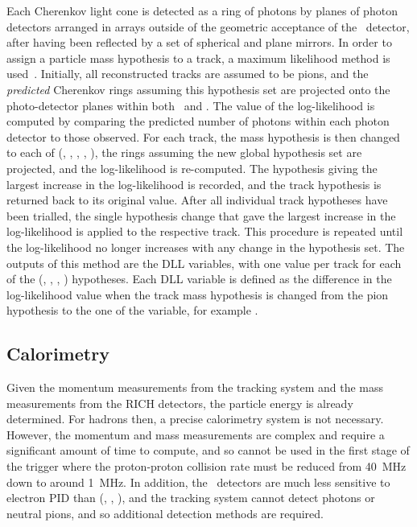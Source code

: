 Each Cherenkov light cone is detected as a ring of photons by planes of photon 
detectors arranged in arrays outside of the geometric acceptance of the \lhcb\ 
detector, after having been reflected by a set of spherical and plane mirrors.
In order to assign a particle mass hypothesis to a track, a maximum likelihood 
method is used~\cite{Forty:1998eqa}.
Initially, all reconstructed tracks are assumed to be pions, and the 
\emph{predicted} Cherenkov rings assuming this hypothesis set are projected 
onto the photo-detector planes within both \richone\ and \richtwo.
The value of the log-likelihood is computed by comparing the predicted number 
of photons within each photon detector to those observed.
For each track, the mass hypothesis is then changed to each of (\Pe, \Pmu, 
\Ppi, \PK, \Pproton), the rings assuming the new global hypothesis set are 
projected, and the log-likelihood is re-computed.
The hypothesis giving the largest increase in the log-likelihood is recorded, 
and the track hypothesis is returned back to its original value.
After all individual track hypotheses have been trialled, the single hypothesis 
change that gave the largest increase in the log-likelihood is applied to the 
respective track.
This procedure is repeated until the log-likelihood no longer increases with 
any change in the hypothesis set.
The outputs of this method are the \ac{DLL} variables, with one value per track 
for each of the (\Pe, \Pmu, \PK, \Pproton) hypotheses.
Each \ac{DLL} variable is defined as the difference in the log-likelihood value 
when the track mass hypothesis is changed from the pion hypothesis to the one 
of the variable, for example \dllkpi.

\subsection{Calorimetry}
\label{chap:intro:lhcb:detector:calo}

Given the momentum measurements from the tracking system and the mass 
measurements from the \ac{RICH} detectors, the particle energy is already 
determined.
For hadrons then, a precise calorimetry system is not necessary.
However, the momentum and mass measurements are complex and require a 
significant amount of time to compute, and so cannot be used in the first stage 
of the trigger where the proton-proton collision rate must be reduced from 
\SI{40}{\mega\hertz} down to around \SI{1}{\mega\hertz}.
In addition, the \rich\ detectors are much less sensitive to electron \ac{PID} 
than (\Pe, \Pmu, \Pproton), and the tracking system cannot detect photons or 
neutral pions, and so additional detection methods are required.

